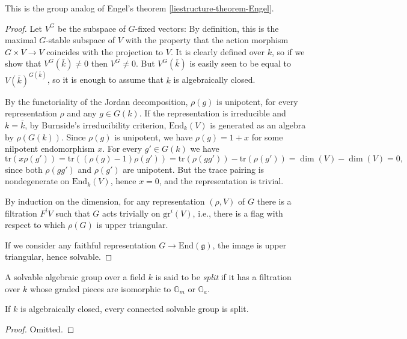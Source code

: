 This is the group analog of Engel's theorem \ref{liestructure-theorem-Engel}.

\begin{proof}
Let $V^G$ be the subspace of $G$-fixed vectors: By definition, this is the maximal $G$-stable subspace of $V$ with the property that the action morphism $G\times V\to V$ coincides with the projection to $V$. It is clearly defined over $k$, so if we show that $V^G(\bar k) \ne 0$ then $V^G\ne 0$. But $V^G(\bar k)$ is easily seen to be equal to $V(\bar k)^{G(\bar k)}$, so it is enough to assume that $k$ is algebraically closed. 

By the functoriality of the Jordan decomposition, $\rho(g)$ is unipotent, for every representation $\rho$ and any $g\in G(k)$. If the representation is irreducible and $k = \bar k$, by Burnside's irreducibility criterion, $\text{End}_k(V)$ is generated as an algebra by $\rho(G(k))$. Since $\rho(g)$ is unipotent, we have $\rho(g) = 1+x$ for some nilpotent endomorphism $x$. For every $g'\in G(k)$ we have 
$$ \text{tr}(x\rho(g')) =\text{tr}((\rho(g)-1)\rho(g'))= \text{tr}(\rho(gg'))-\text{tr}(\rho(g')) = \dim(V)-\dim(V)=0,$$
since both $\rho(gg')$ and $\rho(g')$ are unipotent. But the trace pairing is nondegenerate on $\text{End}_k(V)$, hence $x=0$, and the representation is trivial.

By induction on the dimension, for any representation $(\rho,V)$ of $G$ there is a filtration $F^i V$ such that $G$ acts trivially on $\text{gr}^i(V)$, i.e., there is a flag with respect to which $\rho(G)$ is upper triangular.

If we consider any faithful representation $G\to \text{End}(\mathfrak g)$, the image is upper triangular, hence solvable.
\end{proof}

\begin{definition}
\label{definition-split-solvable}
 A solvable algebraic group over a field $k$ is said to be {\it split} if it has a filtration over $k$ whose graded pieces are isomorphic to $\mathbb G_m$ or $\mathbb G_a$.
\end{definition}

\begin{lemma}
\label{lemma-connected-solvable-split}
 If $k$ is algebraically closed, every connected solvable group is split.
\end{lemma}

\begin{proof}
 Omitted.
\end{proof}

